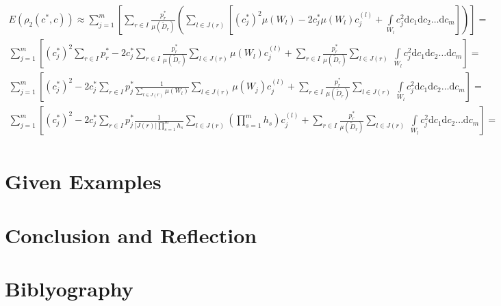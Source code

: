 \documentclass[a4paper]{article}
\numberwithin{equation}{subsection}
\begin{document}
\begin{gather}
\nonumber
E(\rho_{2}(c^{*},c)) \approx \sum\limits_{j=1}^{m}  \left[ \sum\limits_{r \in I} \frac{p_{r}^{*}}{\mu(\tilde{D}_{r})} \left( \sum\limits_{l \in J(r)} \left[ (c_{j}^{*})^{2} \mu(W_{l}) - 2c_{j}^{*} \mu(W_{l}) c_{j}^{(l)} + \int\limits_{W_{l}} c_{j}^{2} \mathrm{d}c_{1} \mathrm{d}c_{2} \dots \mathrm{d}c_{m} \right] \right) \right] = \\
\sum\limits_{j=1}^{m} \left[  (c_{j}^{*})^{2}  \sum\limits_{r \in I} p_{r}^{*}  - 2c_{j}^{*}  \sum\limits_{r \in I} \frac{p_{r}^{*}}{\mu(\tilde{D}_{r})} \sum\limits_{l \in J(r)} \mu(W_{l})  c_{j}^{(l)}  + \sum\limits_{r \in I} \frac{p_{r}^{*}}{\mu(\tilde{D}_{r})} \sum\limits_{l \in J(r)} \ \int\limits_{W_{l}} c_{j}^{2}  \mathrm{d}c_{1} \mathrm{d}c_{2} \dots \mathrm{d}c_{m} \right] = \\
\sum\limits_{j=1}^{m} \left[  (c_{j}^{*})^{2} - 2c_{j}^{*} \sum\limits_{r \in I} p_{j}^{*} \frac{1}{\sum\limits_{l \in J(r)} \mu(W_{l})} \sum\limits_{l \in J(r)} \mu(W_{j}) c_{j}^{(l)} +  \sum\limits_{r \in I} \frac{p_{r}^{*}}{\mu(\tilde{D}_{r})} \sum\limits_{l \in J(r)} \ \int\limits_{W_{l}} c_{j}^{2}  \mathrm{d}c_{1} \mathrm{d}c_{2} \dots \mathrm{d}c_{m} \right] = \\
\sum\limits_{j=1}^{m}  \left[    (c_{j}^{*})^{2} - 2c_{j}^{*} \sum\limits_{r \in I} p_{j}^{*} \frac{1}{\left| J(r) \right| \prod\limits_{s=1}^{m} h_{s}} \sum\limits_{l \in J(r)} \left( \prod_{s=1}^{m} h_{s} \right) c_{j}^{(l)} +  \sum\limits_{r \in I} \frac{p_{r}^{*}}{\mu(\tilde{D}_{r})} \sum\limits_{l \in J(r)} \ \int\limits_{W_{l}} c_{j}^{2}  \mathrm{d}c_{1} \mathrm{d}c_{2} \dots \mathrm{d}c_{m} \right] = \\
\end{gather}


\section{Given Examples}

\section{Conclusion and Reflection}
\newpage

\section*{Biblyography}
\end{document}
